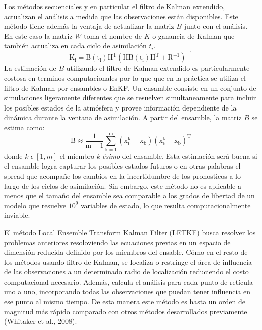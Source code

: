 \documentclass[12pt,twoside]{reedthesis}
\begin{document}
Los métodos secuenciales y en particular el filtro de Kalman extendido, actualizan el análisis a medida que las observaciones están disponibles. Este método tiene además la ventaja de actualizar la matriz \(B\) junto con el análisis. En este caso la matriz \(W\) toma el nombre de \(K\) o ganancia de Kalman que también actualiza en cada ciclo de asimilación \(t_i\).
\begin{equation}
  \mathrm{K_i = B(t_i) H^T (HB(t_i)H^T + R^{-1})^{-1}}
  \label{eq:eq4}
\end{equation}
La estimación de \(B\) utilizando el filtro de Kalman extendido es particularmente costosa en terminos computacionales por lo que que en la práctica se utiliza el filtro de Kalman por ensambles o EnKF. Un ensamble consiste en un conjunto de simulaciones ligeramente diferentes que se resuelven simultaneamente para incluir los posibles estados de la atmósfera y provee información dependiente de la dinámica durante la ventana de asimilación. A partir del ensamble, la matriz \(B\) se estima como:
\begin{equation}
  \mathrm{ B \approx \frac{1}{m-1} \sum_{k=1}^{m}(x_{b}^{k}-\overline{x}_b)(x_{b}^{k}-\overline{x}_b)^T}
  \label{eq:eq5}
\end{equation}
donde \(k \; \epsilon \; [1,m]\) el miembro \emph{k-ésimo} del ensamble. Esta estimación será buena si el ensamble logra capturar los posibles estados futuros o en otras palabras el spread que acompañe los cambios en la incertidumbre de los pronosticos a lo largo de los ciclos de asimilación. Sin embargo, este método no es aplicable a menos que el tamaño del ensamble sea comparable a los grados de libertad de un modelo que resuelve \(10^9\) variables de estado, lo que resulta computacionalmente inviable.

El método Local Ensemble Transform Kalman Filter (LETKF) busca resolver los problemas anteriores resoloviendo las ecuaciones previas en un espacio de dimensión reducida definido por los miembros del ensable. Cómo en el resto de los métodos usando filtro de Kalman, se localiza o restringe el área de influencia de las observaciones a un determinado radio de localización reduciendo el costo computacional necesario. Además, calcula el análisis para cada punto de retícula uno a uno, incorporando todas las observaciones que puedan tener influencia en ese punto al mismo tiempo. De esta manera este método es hasta un orden de magnitud más rápido comparado con otros métodos desarrollados previamente (Whitaker et al., 2008).
\end{document}
